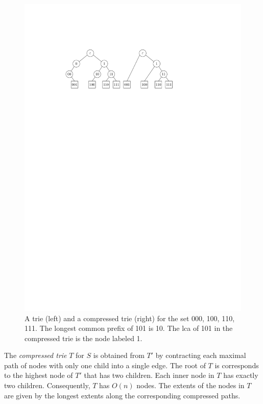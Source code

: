 \documentclass[a4paper,11pt]{article}
\newcommand{\?}{\mskip1.5mu}
\begin{document}
\begin{figure}
  \centering
  \includegraphics{trie}
  \caption{A trie (left) and a compressed trie (right) for the set 
  000, 100, 110, 111. The longest common prefix of 101 is  10. The 
  lca of 101 in the compressed trie
    is the node labeled 1.}
  \label{fig:trie}
\end{figure}

The \emph{compressed trie} $T$ for $S$ is obtained
from $T'$ by contracting each maximal path of nodes
with only one child into a single edge. 
The root of $T$ is corresponds to the highest node of $T'$ that has 
two children.  Each inner node in $T$ has exactly two children. 
Consequently, $T$ has $O(n)$ nodes. 
The extents of the nodes in $T$ are given by the longest 
extents along the corresponding compressed paths.
\end{document}
